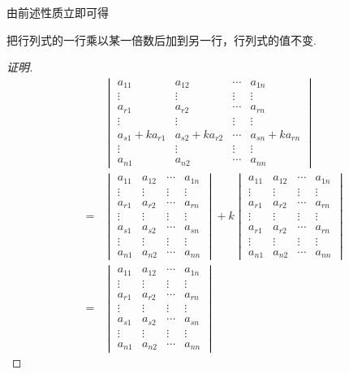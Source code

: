 由前述性质立即可得
\begin{property}
  把行列式的一行乘以某一倍数后加到另一行，行列式的值不变.
\end{property}

\begin{proof}[证明]
  \begin{eqnarray*}
    & & 
  \begin{vmatrix}
    a_{11} & a_{12} & \cdots & a_{1n} \\
    \vdots & \vdots & \vdots & \vdots \\
    a_{r1} & a_{r2} & \cdots & a_{rn} \\
    \vdots & \vdots & \vdots & \vdots \\
    a_{s1}+ka_{r1} & a_{s2}+ka_{r2} & \cdots & a_{sn}+ka_{rn} \\
    \vdots & \vdots & \vdots & \vdots \\
    a_{n1} & a_{n2} & \cdots & a_{nn}
  \end{vmatrix}
    \\
    & = & 
  \begin{vmatrix}
    a_{11} & a_{12} & \cdots & a_{1n} \\
    \vdots & \vdots & \vdots & \vdots \\
    a_{r1} & a_{r2} & \cdots & a_{rn} \\
    \vdots & \vdots & \vdots & \vdots \\
    a_{s1} & a_{s2} & \cdots & a_{sn} \\
    \vdots & \vdots & \vdots & \vdots \\
    a_{n1} & a_{n2} & \cdots & a_{nn}
  \end{vmatrix}
   + k                 
  \begin{vmatrix}
    a_{11} & a_{12} & \cdots & a_{1n} \\
    \vdots & \vdots & \vdots & \vdots \\
    a_{r1} & a_{r2} & \cdots & a_{rn} \\
    \vdots & \vdots & \vdots & \vdots \\
    a_{r1} & a_{r2} & \cdots & a_{rn} \\
    \vdots & \vdots & \vdots & \vdots \\
    a_{n1} & a_{n2} & \cdots & a_{nn}
  \end{vmatrix}
    \\
    & = &
  \begin{vmatrix}
    a_{11} & a_{12} & \cdots & a_{1n} \\
    \vdots & \vdots & \vdots & \vdots \\
    a_{r1} & a_{r2} & \cdots & a_{rn} \\
    \vdots & \vdots & \vdots & \vdots \\
    a_{s1} & a_{s2} & \cdots & a_{sn} \\
    \vdots & \vdots & \vdots & \vdots \\
    a_{n1} & a_{n2} & \cdots & a_{nn}
  \end{vmatrix}
  \end{eqnarray*}
\end{proof}

